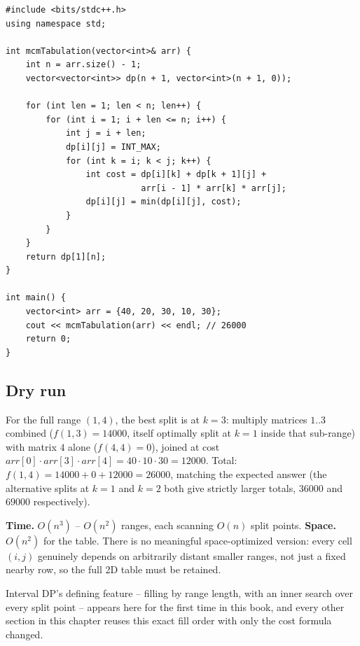 \begin{lstlisting}
#include <bits/stdc++.h>
using namespace std;

int mcmTabulation(vector<int>& arr) {
    int n = arr.size() - 1;
    vector<vector<int>> dp(n + 1, vector<int>(n + 1, 0));

    for (int len = 1; len < n; len++) {
        for (int i = 1; i + len <= n; i++) {
            int j = i + len;
            dp[i][j] = INT_MAX;
            for (int k = i; k < j; k++) {
                int cost = dp[i][k] + dp[k + 1][j] +
                           arr[i - 1] * arr[k] * arr[j];
                dp[i][j] = min(dp[i][j], cost);
            }
        }
    }
    return dp[1][n];
}

int main() {
    vector<int> arr = {40, 20, 30, 10, 30};
    cout << mcmTabulation(arr) << endl; // 26000
    return 0;
}
\end{lstlisting}

\subsection*{Dry run}


For the full range $(1,4)$, the best split is at $k=3$: multiply
matrices $1..3$ combined ($f(1,3)=14000$, itself optimally split at
$k=1$ inside that sub-range) with matrix $4$ alone ($f(4,4)=0$), joined
at cost $\textit{arr}[0]\cdot\textit{arr}[3]\cdot\textit{arr}[4] =
40\cdot10\cdot30=12000$. Total:
$f(1,4)=14000+0+12000=26000$, matching the expected answer (the
alternative splits at $k=1$ and $k=2$ both give strictly larger
totals, $36000$ and $69000$ respectively).

\begin{complexitybox}
\textbf{Time.} $O(n^3)$ -- $O(n^2)$ ranges, each scanning $O(n)$ split
points.
\textbf{Space.} $O(n^2)$ for the table. There is no meaningful
space-optimized version: every cell $(i,j)$ genuinely depends on
arbitrarily distant smaller ranges, not just a fixed nearby row, so the
full 2D table must be retained.
\end{complexitybox}

\begin{takeawaybox}
Interval DP's defining feature -- filling by range length, with an
inner search over every split point -- appears here for the first time
in this book, and every other section in this chapter reuses this exact
fill order with only the cost formula changed.
\end{takeawaybox}
